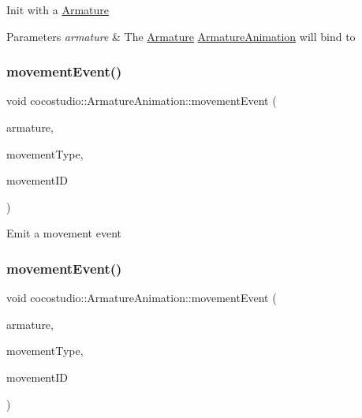 Init with a \hyperlink{classcocostudio_1_1Armature}{Armature} 
\begin{DoxyParams}{Parameters}
{\em armature} & The \hyperlink{classcocostudio_1_1Armature}{Armature} \hyperlink{classcocostudio_1_1ArmatureAnimation}{Armature\+Animation} will bind to \\
\hline
\end{DoxyParams}
\mbox{\label{classcocostudio_1_1ArmatureAnimation_af4344e809d3081c651f6df125f8cf40d}} 
\subsubsection{\texorpdfstring{movement\+Event()}{movementEvent()}\hspace{0.1cm}{\footnotesize\ttfamily [1/2]}}
{\footnotesize\ttfamily void cocostudio\+::\+Armature\+Animation\+::movement\+Event (\begin{DoxyParamCaption}\item[{\hyperlink{classcocostudio_1_1Armature}{Armature} $\ast$}]{armature,  }\item[{Movement\+Event\+Type}]{movement\+Type,  }\item[{const std\+::string \&}]{movement\+ID }\end{DoxyParamCaption})\hspace{0.3cm}{\ttfamily [protected]}}

Emit a movement event \mbox{\label{classcocostudio_1_1ArmatureAnimation_af4344e809d3081c651f6df125f8cf40d}} 
\subsubsection{\texorpdfstring{movement\+Event()}{movementEvent()}\hspace{0.1cm}{\footnotesize\ttfamily [2/2]}}
{\footnotesize\ttfamily void cocostudio\+::\+Armature\+Animation\+::movement\+Event (\begin{DoxyParamCaption}\item[{\hyperlink{classcocostudio_1_1Armature}{Armature} $\ast$}]{armature,  }\item[{Movement\+Event\+Type}]{movement\+Type,  }\item[{const std\+::string \&}]{movement\+ID }\end{DoxyParamCaption})\hspace{0.3cm}{\ttfamily [protected]}}

